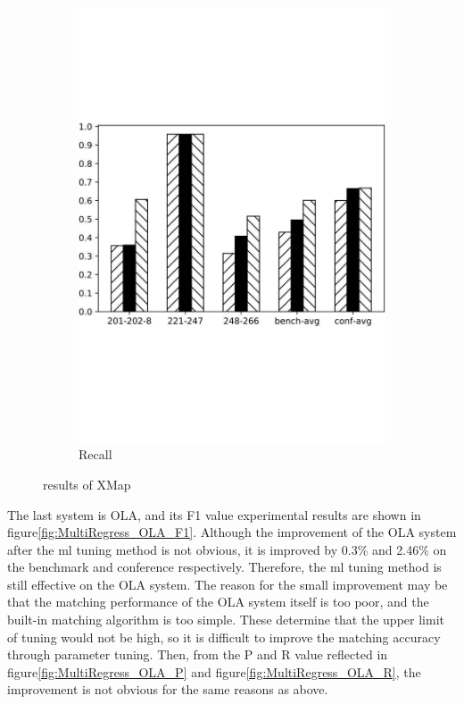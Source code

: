 \documentclass[twoside]{article}
\begin{document}
\begin{figure}[htb!]
\begin{subfigure}{0.3\textwidth}
\includegraphics[width=\textwidth]{data_figs/MulRegress_XMap_R.pdf}
\caption{Recall}
\label{fig:MultiRegress_XMap_R}
\end{subfigure}
\caption{results of XMap}
\end{figure}

The last system is OLA, and its F1 value experimental results are shown in figure\ref{fig:MultiRegress_OLA_F1}.
Although the improvement of the OLA system after the ml tuning method is not obvious, it is improved by 0.3\% and 2.46\% on the benchmark and conference respectively. Therefore, the ml tuning method is still effective on the OLA system.
The reason for the small improvement may be that the matching performance of the OLA system itself is too poor, and the built-in matching algorithm is too simple. These determine that the upper limit of tuning would not be high, so it is difficult to improve the matching accuracy through parameter tuning.
Then, from the P and R value reflected in figure\ref{fig:MultiRegress_OLA_P} and figure\ref{fig:MultiRegress_OLA_R}, the improvement is not obvious for the same reasons as above.
\end{document}
